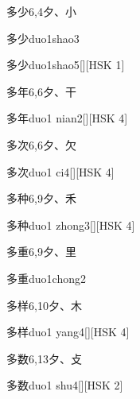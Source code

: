 \begin{entry}{多少}{6,4}{⼣、⼩}
  \begin{phonetics}{多少}{duo1shao3}
  \end{phonetics}
  \begin{phonetics}{多少}{duo1shao5}[][HSK 1]
  \end{phonetics}
\end{entry}

\begin{entry}{多年}{6,6}{⼣、⼲}
  \begin{phonetics}{多年}{duo1 nian2}[][HSK 4]
  \end{phonetics}
\end{entry}

\begin{entry}{多次}{6,6}{⼣、⽋}
  \begin{phonetics}{多次}{duo1 ci4}[][HSK 4]
  \end{phonetics}
\end{entry}

\begin{entry}{多种}{6,9}{⼣、⽲}
  \begin{phonetics}{多种}{duo1 zhong3}[][HSK 4]
  \end{phonetics}
\end{entry}

\begin{entry}{多重}{6,9}{⼣、⾥}
  \begin{phonetics}{多重}{duo1chong2}
  \end{phonetics}
\end{entry}

\begin{entry}{多样}{6,10}{⼣、⽊}
  \begin{phonetics}{多样}{duo1 yang4}[][HSK 4]
  \end{phonetics}
\end{entry}

\begin{entry}{多数}{6,13}{⼣、⽁}
  \begin{phonetics}{多数}{duo1 shu4}[][HSK 2]
  \end{phonetics}
\end{entry}


